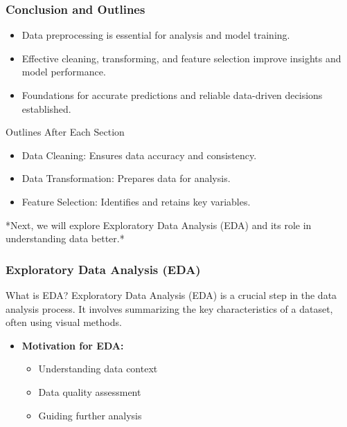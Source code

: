 \documentclass[aspectratio=169]{beamer}
\begin{document}
\begin{frame}[fragile]
    \frametitle{Conclusion and Outlines}
    \begin{itemize}
        \item Data preprocessing is essential for analysis and model training.
        \item Effective cleaning, transforming, and feature selection improve insights and model performance.
        \item Foundations for accurate predictions and reliable data-driven decisions established.
    \end{itemize}
    \begin{block}{Outlines After Each Section}
        \begin{itemize}
            \item Data Cleaning: Ensures data accuracy and consistency.
            \item Data Transformation: Prepares data for analysis.
            \item Feature Selection: Identifies and retains key variables.
        \end{itemize}
    \end{block}
    *Next, we will explore Exploratory Data Analysis (EDA) and its role in understanding data better.*
\end{frame}

\begin{frame}
    \frametitle{Exploratory Data Analysis (EDA)}
    \begin{block}{What is EDA?}
        Exploratory Data Analysis (EDA) is a crucial step in the data analysis process. It involves summarizing the key characteristics of a dataset, often using visual methods.
    \end{block}

    \begin{itemize}
        \item \textbf{Motivation for EDA:}
        \begin{itemize}
            \item Understanding data context
            \item Data quality assessment
            \item Guiding further analysis
        \end{itemize}
    \end{itemize}
\end{frame}
\end{document}
